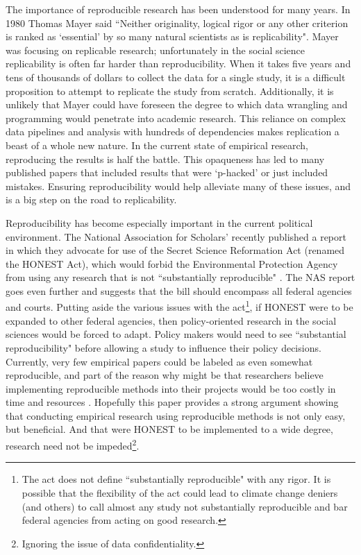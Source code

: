 \documentclass[12pt]{article}
\begin{document}
The importance of reproducible research has been understood for many years. In 1980 Thomas Mayer said ``Neither originality, logical rigor or any other criterion is ranked as `essential' by so many natural scientists as is replicability". Mayer was focusing on replicable research; unfortunately in the social science replicability is often far harder than reproducibility. When it takes five years and tens of thousands of dollars to collect the data for a single study, it is a difficult proposition to attempt to replicate the study from scratch. Additionally, it is unlikely that Mayer could have foreseen the degree to which data wrangling and programming would penetrate into academic research. This reliance on complex data pipelines and analysis with hundreds of dependencies makes replication a beast of a whole new nature. In the current state of empirical research, reproducing the results is half the battle. This opaqueness has led to many published papers that included results that were `p-hacked' or just included mistakes. Ensuring reproducibility would help alleviate many of these issues, and is a big step on the road to replicability.

Reproducibility has become especially important in the current political environment. The National Association for Scholars' recently published a report in which they advocate for use of the Secret Science Reformation Act (renamed the HONEST Act), which would forbid the Environmental Protection Agency from using any research that is not ``substantially reproducible" \cite{wired}. The NAS report goes even further and suggests that the bill should encompass all federal agencies and courts. Putting aside the various issues with the act\footnote{The act does not define ``substantially reproducible" with any rigor. It is possible that the flexibility of the act could lead to climate change deniers (and others) to call almost any study not substantially reproducible and bar federal agencies from acting on good research.}, if HONEST were to be expanded to other federal agencies, then policy-oriented research in the social sciences would be forced to adapt. Policy makers would need to see ``substantial reproducibility" before allowing a study to influence their policy decisions. Currently, very few empirical papers could be labeled as even somewhat reproducible, and part of the reason why might be that researchers believe implementing reproducible methods into their projects would be too costly in time and resources \cite{irreproducible}. Hopefully this paper provides a strong argument showing that conducting empirical research using reproducible methods is not only easy, but beneficial. And that were HONEST to be implemented to a wide degree, research need not be impeded\footnote{Ignoring the issue of data confidentiality.}.
\end{document}
